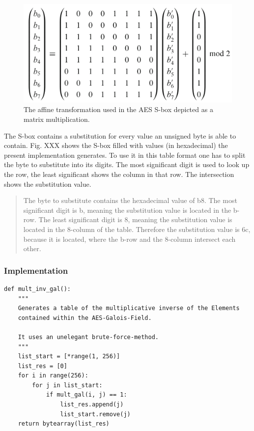 \begin{figure}
\centering
\includegraphics[scale = 0.3]{data/figures/affinetrans.png} 
\caption{The affine transformation used in the AES S-box depicted as a matrix multiplication.}
\end{figure}

The S-box contains a substitution for every value an unsigned byte is
able to contain. Fig. XXX shows the S-box filled with values (in
hexadecimal) the present implementation generates. To use it in this
table format one has to split the byte to substitute into its digits.
The most significant digit is used to look up the row, the least
significant shows the column in that row. The intersection shows the
substitution value.

\begin{quote}
The byte to substitute contains the hexadecimal value of b8. The most
significant digit is b, meaning the substitution value is located in the
b-row. The least significant digit is 8, meaning the substitution value
is located in the 8-column of the table. Therefore the substitution
value is 6c, because it is located, where the b-row and the 8-column
intersect each other.
\end{quote}

\hypertarget{implementation-1}{%
\subsubsection{Implementation}\label{implementation-1}}

\begin{lstlisting}
def mult_inv_gal():
    """
    Generates a table of the multiplicative inverse of the Elements
    contained within the AES-Galois-Field.

    It uses an unelegant brute-force-method.
    """
    list_start = [*range(1, 256)]
    list_res = [0]
    for i in range(256):
        for j in list_start:
            if mult_gal(i, j) == 1:
                list_res.append(j)
                list_start.remove(j)
    return bytearray(list_res)
\end{lstlisting}

